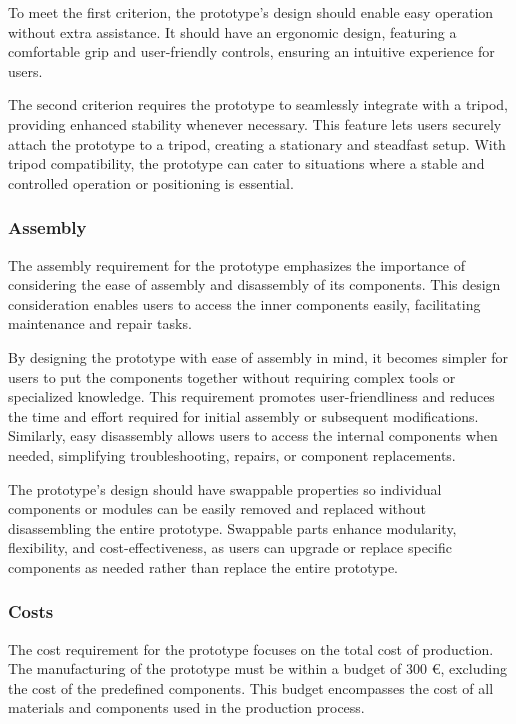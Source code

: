 To meet the first criterion, the prototype's design should enable easy operation without extra assistance. It should have an ergonomic design, featuring a comfortable grip and user-friendly controls, ensuring an intuitive experience for users.

The second criterion requires the prototype to seamlessly integrate with a tripod, providing enhanced stability whenever necessary. This feature lets users securely attach the prototype to a tripod, creating a stationary and steadfast setup. With tripod compatibility, the prototype can cater to situations where a stable and controlled operation or positioning is essential.

\subsubsection{Assembly}
The assembly requirement for the prototype emphasizes the importance of considering the ease of assembly and disassembly of its components. This design consideration enables users to access the inner components easily, facilitating maintenance and repair tasks.

By designing the prototype with ease of assembly in mind, it becomes simpler for users to put the components together without requiring complex tools or specialized knowledge. This requirement promotes user-friendliness and reduces the time and effort required for initial assembly or subsequent modifications. Similarly, easy disassembly allows users to access the internal components when needed, simplifying troubleshooting, repairs, or component replacements.

The prototype's design should have swappable properties so individual components or modules can be easily removed and replaced without disassembling the entire prototype. Swappable parts enhance modularity, flexibility, and cost-effectiveness, as users can upgrade or replace specific components as needed rather than replace the entire prototype.

\subsubsection{Costs}
The cost requirement for the prototype focuses on the total cost of production. The manufacturing of the prototype must be within a budget of 300 €, excluding the cost of the predefined components. This budget encompasses the cost of all materials and components used in the production process.


